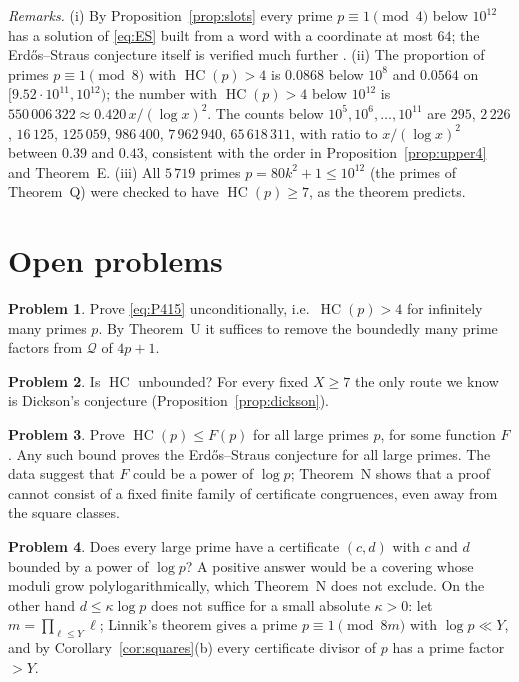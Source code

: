\documentclass[11pt,reqno]{amsart}
\theoremstyle{definition}
\newtheorem{problem}{Problem}
\newcommand{\cQ}{\mathcal Q}
\newcommand{\HC}{\operatorname{HC}}
\begin{document}
\emph{Remarks.}  (i) By Proposition~\ref{prop:slots} every prime
$p\equiv1\pmod4$ below $10^{12}$ has a solution of \eqref{eq:ES} built
from a word with a coordinate at most $64$; the Erd\H{o}s--Straus
conjecture itself is verified much further \cite{Salez,MD}.  (ii) The
proportion of primes $p\equiv1\pmod8$ with $\HC(p)>4$ is $0.0868$ below
$10^8$ and $0.0564$ on $[9.52\cdot10^{11},10^{12})$; the number with
$\HC(p)>4$ below $10^{12}$ is $550\,006\,322\approx0.420\,x/(\log x)^2$.
The counts below $10^5,10^6,\dots,10^{11}$ are $295$, $2\,226$,
$16\,125$, $125\,059$, $986\,400$, $7\,962\,940$, $65\,618\,311$, with ratio
to $x/(\log x)^2$ between $0.39$ and $0.43$, consistent with the order in
Proposition~\ref{prop:upper4} and Theorem~E.  (iii) All $5\,719$ primes
$p=80k^2+1\le10^{12}$ (the primes of Theorem~Q) were checked to have
$\HC(p)\ge7$, as the theorem predicts.

\section{Open problems}\label{sec:open}

\begin{problem}
Prove \eqref{eq:P415} unconditionally, i.e.\ $\HC(p)>4$ for infinitely many
primes $p$.  By Theorem~U it suffices to remove the boundedly many prime
factors from $\cQ$ of $4p+1$.
\end{problem}

\begin{problem}
Is $\HC$ unbounded?  For every fixed $X\ge7$ the only route we know is
Dickson's conjecture (Proposition~\ref{prop:dickson}).
\end{problem}

\begin{problem}
Prove $\HC(p)\le F(p)$ for all large primes $p$, for some function $F$.
Any such bound proves the Erd\H{o}s--Straus conjecture for all large
primes.  The data suggest that $F$ could be a power of $\log p$; Theorem~N
shows that a proof cannot consist of a fixed finite family of certificate
congruences, even away from the square classes.
\end{problem}

\begin{problem}
Does every large prime have a certificate $(c,d)$ with $c$ and $d$
bounded by a power of $\log p$?  A positive answer would be a covering
whose moduli grow polylogarithmically, which Theorem~N does not exclude.
On the other hand $d\le\kappa\log p$ does not suffice for a small absolute
$\kappa>0$: let $m=\prod_{\ell\le Y}\ell$; Linnik's theorem \cite{HB}
gives a prime $p\equiv1\pmod{8m}$ with $\log p\ll Y$, and by
Corollary~\ref{cor:squares}(b) every certificate divisor of $p$ has a
prime factor $>Y$.
\end{problem}
\end{document}
